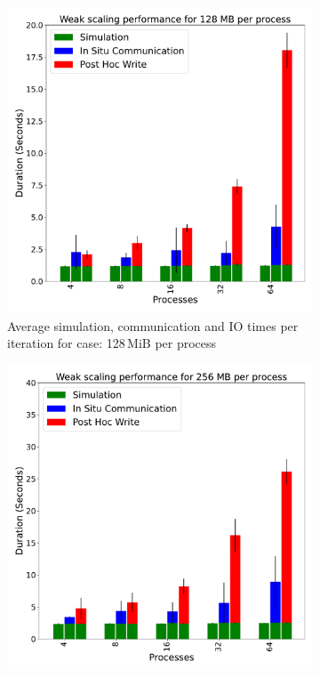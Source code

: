 \begin{figure}
     \centering
     \begin{subfigure}[b]{0.3\textwidth}
         \centering
         \includegraphics[width=\textwidth, height=\textwidth]{figures/128MB.pdf}
         \caption{Average simulation, communication and IO times per iteration for case: 128\,MiB per process}
         \label{fig:X128}
     \end{subfigure}
     \hfill
     \begin{subfigure}[b]{0.3\textwidth}
         \centering
         \includegraphics[width=\textwidth, height=\textwidth]{figures/256MB.pdf}

\end{subfigure}
\end{figure}
